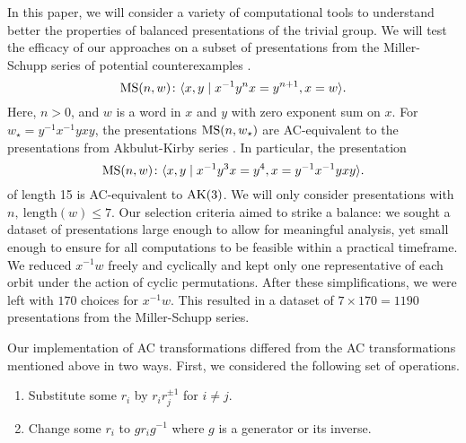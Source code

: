 In this paper, we will consider a variety of computational tools to understand better the properties of balanced presentations of the trivial group. We will test the efficacy of our approaches on a subset of presentations from the Miller-Schupp series of potential counterexamples \cite{Miller-Schupp}.
\[
\text{MS}(n, w) \colon \langle x, y \mid x^{-1} y^n x = y^{n+1}, x = w\rangle.
\]
Here, $n > 0$, and $w$ is a word in $x$ and $y$ with zero exponent sum on $x$. For $w_\star = y^{-1} x^{-1} y x y$, the presentations $\text{MS}(n, w_\star)$ are AC-equivalent to the presentations from Akbulut-Kirby series \cite{MMS}. In particular, the presentation
\[
\text{MS}(n, w) \colon \langle x, y \mid x^{-1} y^3 x = y^{4}, x =  y^{-1} x^{-1} y x y\rangle.
\]
of length 15 is AC-equivalent to $\text{AK}(3)$. We will only consider presentations with $n,\  \text{length}(w) \leq 7$. 
Our selection criteria aimed to strike a balance: we sought a dataset of presentations large enough to allow for meaningful analysis, yet small enough to ensure for all computations to be feasible within a practical timeframe.
We reduced $x^{-1}w$ freely and cyclically and kept only one representative of each orbit under the action of cyclic permutations. After these simplifications, we were left with $170$ choices for $x^{-1} w$. This resulted in a dataset of $7 \times 170 = 1190$ presentations from the Miller-Schupp series.
\newline

Our implementation of AC transformations differed from the AC transformations mentioned above in two ways. First, we considered the following set of operations.
\begin{enumerate}[label=(AC$'$\arabic*)]
	\item Substitute some $r_i$ by $r_i r_j^{\pm 1}$ for $i \neq j$.
	\item Change some $r_i$ to $g r_i g^{-1}$ where $g$ is a generator or its inverse.
\end{enumerate}

